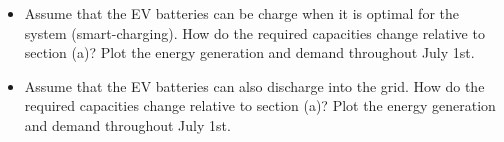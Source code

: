 \documentclass[10pt]{article}
\newenvironment{problem}[2][Problem]{\begin{trivlist}
\item[\hskip \labelsep {\bfseries #1}\hskip \labelsep {\bfseries #2.}]}{\end{trivlist}}
\begin{document}
\begin{problem}{11.2}
\begin{itemize}
\item[b)] Assume that the EV batteries can be charge when it is optimal for the system (smart-charging). How do the required capacities change relative to section (a)? Plot the energy generation and demand throughout July 1st. 


\item[c)] Assume that the EV batteries can also discharge into the grid. How do the required capacities change relative to section (a)? Plot the energy generation and demand throughout July 1st. 

\end{itemize}


\

\end{problem}



\end{document}

